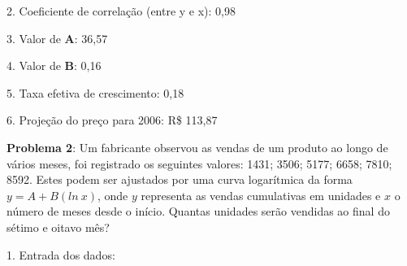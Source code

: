 2. Coeficiente de correlação (entre y e x): 0,98 \\
  

3. Valor de \textbf{A}: 36,57 \\
     

4. Valor de \textbf{B}: 0,16 \\
            \keystroke{$\div$}  

5. Taxa efetiva de crescimento: 0,18 \\
   \keystroke{$-$} 

6. Projeção do preço para 2006: R\$ 113,87 \\
     

\textbf{Problema 2}: Um fabricante observou as vendas de um produto ao longo de vários meses, foi registrado os seguintes valores: 1431; 3506; 5177; 6658; 7810; 8592. Estes podem ser ajustados por uma curva logarítmica da forma $y = A + B (ln\ x)$, onde $y$ representa as vendas cumulativas em unidades e $x$ o número de meses desde o início. Quantas unidades serão vendidas ao final do sétimo e oitavo mês?

1. Entrada dos dados: \\
  \\
         \keystroke{$\sum+$} \\
         \keystroke{$\sum+$} \\
         \keystroke{$\sum+$} \\
         \keystroke{$\sum+$} \\
         \keystroke{$\sum+$} \\
         \keystroke{$\sum+$}

